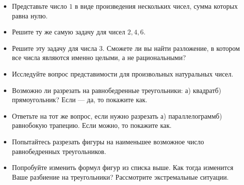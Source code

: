 \documentclass[10pt]{scrbook} \usepackage{modules/nonstahp_book}
\begin{document}

\begin{itemize}
\item Представьте число $1$ в виде произведения нескольких чисел, сумма которых равна нулю.
\item Решите ту же самую задачу для чисел $2,4,6$.
\item Решите эту задачу для числа $3$. Сможете ли вы найти разложение, в котором все числа являются именно целыми, а не рациональными?
\item Исследуйте вопрос представимости для произвольных натуральных чисел.
\end{itemize}


\begin{itemize}
\item Возможно ли разрезать на равнобедренные треугольники: а) квадрат\scolon б) прямоугольник? Если --- да, то покажите как.
\item Ответьте на тот же вопрос, если нужно разрезать а) параллелограмм\scolon б) равнобокую трапецию. Если можно, то покажите как.
\item Попытайтесь разрезать фигуры на наименьшее возможное число равнобедренных треугольников.
\item Попробуйте изменить формул фигур из списка выше. Как тогда изменится Ваше разбиение на треугольники? Рассмотрите экстремальные ситуации.
\end{itemize}

\end{document}

